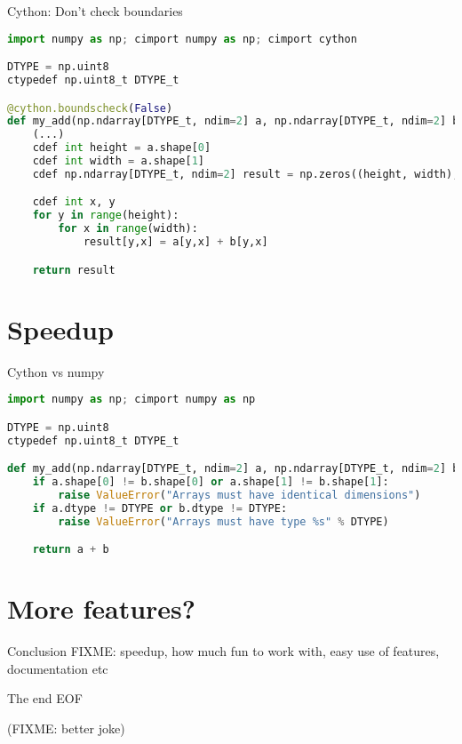 \documentclass[dvipsnames]{beamer}
\begin{document}
\begin{frame}[fragile]{Cython: Don't check boundaries}
\begin{lstlisting}[language=Python,caption={add5.pyx}]
import numpy as np; cimport numpy as np; cimport cython

DTYPE = np.uint8
ctypedef np.uint8_t DTYPE_t

@cython.boundscheck(False)
def my_add(np.ndarray[DTYPE_t, ndim=2] a, np.ndarray[DTYPE_t, ndim=2] b):
    (...)
    cdef int height = a.shape[0]
    cdef int width = a.shape[1]
    cdef np.ndarray[DTYPE_t, ndim=2] result = np.zeros((height, width), dtype=DTYPE)

    cdef int x, y
    for y in range(height):
        for x in range(width):
            result[y,x] = a[y,x] + b[y,x]

    return result
\end{lstlisting}
\end{frame}

\section{Speedup}

\begin{frame}[fragile]{Cython vs numpy}

\begin{lstlisting}[language=Python,caption={add6.pyx}]
import numpy as np; cimport numpy as np

DTYPE = np.uint8
ctypedef np.uint8_t DTYPE_t

def my_add(np.ndarray[DTYPE_t, ndim=2] a, np.ndarray[DTYPE_t, ndim=2] b):
    if a.shape[0] != b.shape[0] or a.shape[1] != b.shape[1]:
        raise ValueError("Arrays must have identical dimensions")
    if a.dtype != DTYPE or b.dtype != DTYPE:
        raise ValueError("Arrays must have type %s" % DTYPE)

    return a + b
\end{lstlisting}
\end{frame}

\section{More features?}

\begin{frame}{Conclusion}
FIXME: speedup, how much fun to work with, easy use of features, documentation etc
\end{frame}

\begin{frame}{The end}
EOF

(FIXME: better joke)
\end{frame}
\end{document}
